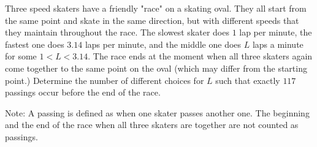 Three speed skaters have a friendly "race" on a skating oval. They all start from the same point and skate in the same direction, but with different speeds that they maintain throughout the race. The slowest skater does $1$ lap per minute, the fastest one does $3.14$ laps per minute, and the middle one does $L$ laps a minute for some $1 < L < 3.14$. The race ends at the moment when all three skaters again come together to the same point on the oval (which may differ from the starting point.) Determine the number of different choices for $L$ such that exactly $117$ passings occur before the end of the race.

Note: A passing is defined as when one skater passes another one. The beginning and the end of the race when all three skaters are together are not counted as passings.